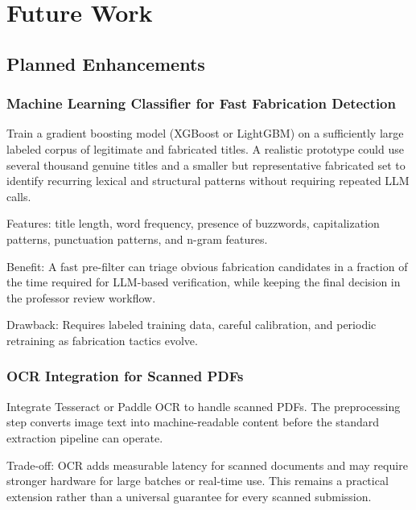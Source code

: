 \documentclass[12pt,a4paper,oneside]{report}
\begin{document}
\chapter{Future Work}

\section{Planned Enhancements}

\subsection{Machine Learning Classifier for Fast Fabrication Detection}

Train a gradient boosting model (XGBoost or LightGBM) on a sufficiently large labeled corpus of legitimate and fabricated titles. A realistic prototype could use several thousand genuine titles and a smaller but representative fabricated set to identify recurring lexical and structural patterns without requiring repeated LLM calls.

Features: title length, word frequency, presence of buzzwords, capitalization patterns, punctuation patterns, and n-gram features.

Benefit: A fast pre-filter can triage obvious fabrication candidates in a fraction of the time required for LLM-based verification, while keeping the final decision in the professor review workflow.

Drawback: Requires labeled training data, careful calibration, and periodic retraining as fabrication tactics evolve.

\subsection{OCR Integration for Scanned PDFs}

Integrate Tesseract or Paddle OCR to handle scanned PDFs. The preprocessing step converts image text into machine-readable content before the standard extraction pipeline can operate.

Trade-off: OCR adds measurable latency for scanned documents and may require stronger hardware for large batches or real-time use. This remains a practical extension rather than a universal guarantee for every scanned submission.
\end{document}
